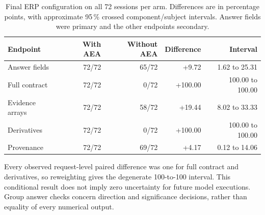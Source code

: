 \begin{table}[!htbp]
\centering\small
\caption{Final ERP configuration on all 72 sessions per arm. Differences are in percentage points, with approximate 95\,\% crossed component/subject intervals. Answer fields were primary and the other endpoints secondary.}
\label{tab:erp-paired-configurations}
\begin{tabular}{lrrrr}
\toprule
Endpoint & With AEA & Without AEA & Difference & Interval \\
\midrule
Answer fields & 72/72 & 65/72 & +9.72 & 1.62 to 25.31 \\
Full contract & 72/72 & 0/72 & +100.00 & 100.00 to 100.00 \\
Evidence arrays & 72/72 & 58/72 & +19.44 & 8.02 to 33.33 \\
Derivatives & 72/72 & 0/72 & +100.00 & 100.00 to 100.00 \\
Provenance & 72/72 & 69/72 & +4.17 & 0.12 to 14.06 \\
\bottomrule
\end{tabular}
\par\smallskip
\begin{minipage}{\linewidth}\footnotesize
Every observed request-level paired difference was one for full contract and derivatives, so reweighting gives the degenerate 100-to-100 interval. This conditional result does not imply zero uncertainty for future model executions. Group answer checks concern direction and significance decisions, rather than equality of every numerical output.
\end{minipage}
\end{table}
